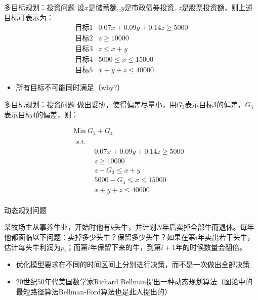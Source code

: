 \documentclass[mathserif, table]{beamer}
\begin{document}
\begin{frame}{多目标规划：投资问题}
  设$x$是储蓄额, $y$是市政债券投资, $z$是股票投资额，则上述目标可表示为：
  \[
  \left.
    \begin{array}{lr}
      \text{目标1} & 0.07x + 0.09y + 0.14z \ge 5000\\
      \text{目标2} & z \ge 10000\\
      \text{目标3} & z \le x + y\\
      \text{目标4} & 5000 \le x  \le 15000\\
      \text{目标5} & x+y+z \le 40000
    \end{array}
  \right.
  \]

  \begin{itemize}
  \item 所有目标不可能同时满足（why?）
  \end{itemize}

\end{frame}

\begin{frame}{多目标规划：投资问题}
  做出妥协，使得偏差尽量小，用$G_3$表示目标3的偏差，$G_4$表示目标4的偏差，则：

    \[ 
    \begin{array}{c}
      \mbox{Min}\ G_3+G_4\\
      \begin{array}{ll}
        \mbox{s.t.} & \\
        &
        \begin{array}{l}
          0.07x + 0.09y + 0.14z \ge 5000\\
          z \ge 10000\\
          z - G_3 \le x + y\\
          5000 -G_4 \le x  \le 15000\\
          x+y+z \le 40000
        \end{array}
      \end{array}
    \end{array}
    \]
  
\end{frame}

\begin{frame}{动态规划问题}
  \begin{block}{}
    某牧场主从事养牛业，开始时他有$k$头牛，并计划$N$年后卖掉全部牛而退休。每年他都面临以下问题：卖掉多少头牛？保留多少头牛？如果在第$i$年卖出若干头牛，估计每头牛利润为$p_i$；而第$i$年保留下来的牛，到第$i+1$年的时候数量会翻倍。
  \end{block}
  
  \begin{itemize}
  \item 优化模型要求在不同的时间区间上分别进行决策，而不是一次做出全部决策
  \item 20世纪50年代美国数学家Richard Bellman提出一种动态规划算法（图论中的最短路径算法Bellman-Ford算法也是此人提出的）
  \end{itemize}
\end{frame}
\end{document}
